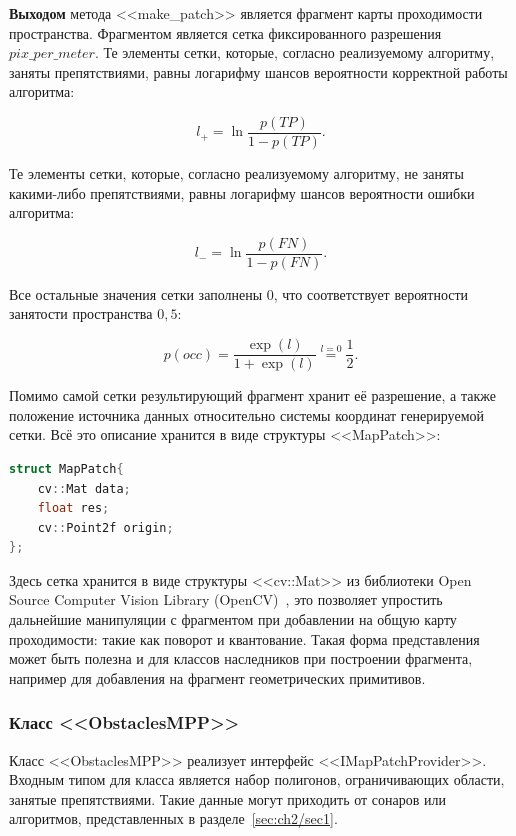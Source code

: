 \textbf{Выходом} метода <<make\_patch>> является фрагмент карты проходимости пространства. Фрагментом является сетка фиксированного разрешения $pix\_per\_meter$. Те элементы сетки, которые, согласно реализуемому алгоритму, заняты препятствиями, равны логарифму шансов вероятности корректной работы алгоритма:

\begin{equation}
	l_+ = \ln\dfrac{p(TP)}{1 - p(TP)}.
	\label{eq:patch_l_plus}
\end{equation} 

Те элементы сетки, которые, согласно реализуемому алгоритму, не заняты какими-либо препятствиями, равны логарифму шансов вероятности ошибки алгоритма:

\begin{equation}
	l_- = \ln\dfrac{p(FN)}{1 - p(FN)}.
	\label{eq:patch_l_minus}
\end{equation}

Все остальные значения сетки заполнены $0$, что соответствует вероятности занятости пространства $0,5$:

\begin{equation}
	p(occ) = \dfrac{\exp({l})}{1 + \exp({l})} \stackrel{l=0}{=}  \dfrac{1}{2}.
	\label{eq:patch_occ_prob}
\end{equation}

Помимо самой сетки результирующий фрагмент хранит её разрешение, а также положение источника данных относительно системы координат генерируемой сетки. Всё это описание хранится в виде структуры <<MapPatch>>:

\begin{lstlisting}[language=C++,numbers=none]
struct MapPatch{
	cv::Mat data;
	float res;
	cv::Point2f origin;
};
\end{lstlisting}

Здесь сетка хранится в виде структуры <<cv::Mat>> из библиотеки Open Source Computer Vision Library (OpenCV)~\cite{opencv}, это позволяет упростить дальнейшие манипуляции с фрагментом при добавлении на общую карту проходимости: такие как поворот и квантование. Такая форма представления может быть полезна и для классов наследников при построении фрагмента, например для добавления на фрагмент геометрических примитивов. 

\subsubsection{Класс <<ObstaclesMPP>>}

Класс <<ObstaclesMPP>> реализует интерфейс <<IMapPatchProvider>>. Входным типом для класса является набор полигонов, ограничивающих области, занятые препятствиями. Такие данные могут приходить от сонаров или алгоритмов, представленных в разделе~\cref{sec:ch2/sec1}. 

